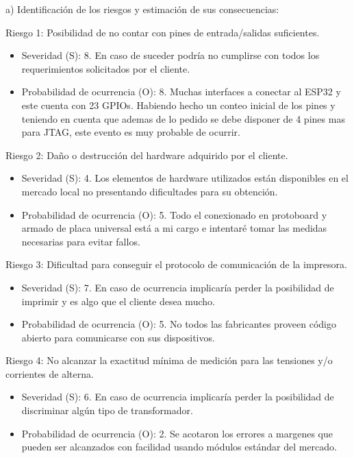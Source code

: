 \documentclass[11pt]{charter}
\begin{document}
a) Identificación de los riesgos y estimación de sus consecuencias:

Riesgo 1: Posibilidad de no contar con pines de entrada/salidas suficientes.
\begin{itemize}
\item Severidad (S): 8. En caso de suceder podría no cumplirse con todos los requerimientos solicitados por el cliente.
\item Probabilidad de ocurrencia (O): 8. Muchas interfaces a conectar al ESP32 y este cuenta con 23 GPIOs. Habiendo hecho un conteo inicial de los pines y teniendo en cuenta que ademas de lo pedido se debe disponer de 4 pines mas para JTAG, este evento es muy probable de ocurrir.
\end{itemize}  

Riesgo 2: Daño o destrucción del hardware adquirido por el cliente.
\begin{itemize}
\item Severidad (S): 4. Los elementos de hardware utilizados están disponibles en el mercado local no presentando dificultades para su obtención.
\item Probabilidad de ocurrencia (O): 5. Todo el conexionado en protoboard y armado de placa universal está a mi cargo e intentaré tomar las medidas necesarias para evitar fallos.
\end{itemize}

Riesgo 3: Dificultad para conseguir el protocolo de comunicación de la impresora.
\begin{itemize}
\item Severidad (S): 7. En caso de ocurrencia implicaría perder la posibilidad de imprimir y es algo que el cliente desea mucho.
\item Probabilidad de ocurrencia (O): 5. No todos las fabricantes proveen código abierto para comunicarse con sus dispositivos.
\end{itemize}

Riesgo 4: No alcanzar la exactitud mínima de medición para las tensiones y/o corrientes de alterna.
\begin{itemize}
\item Severidad (S): 6. En caso de ocurrencia implicaría perder la posibilidad de discriminar algún tipo de transformador. 
\item Probabilidad de ocurrencia (O): 2. Se acotaron los errores a margenes que pueden ser alcanzados con facilidad usando módulos estándar del mercado.
\end{itemize}
\end{document}
